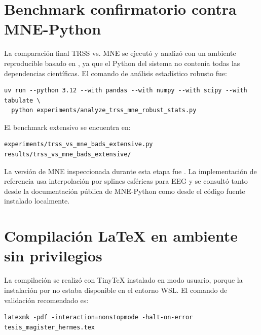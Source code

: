 \section{Benchmark confirmatorio contra MNE-Python}
La comparación final TRSS vs. MNE se ejecutó y analizó con un ambiente reproducible basado en , ya que el Python del sistema no contenía todas las dependencias científicas. El comando de análisis estadístico robusto fue:
\begin{verbatim}
uv run --python 3.12 --with pandas --with numpy --with scipy --with tabulate \
  python experiments/analyze_trss_mne_robust_stats.py
\end{verbatim}

El benchmark extensivo se encuentra en:
\begin{verbatim}
experiments/trss_vs_mne_bads_extensive.py
results/trss_vs_mne_bads_extensive/
\end{verbatim}

La versión de MNE inspeccionada durante esta etapa fue . La implementación de referencia usa interpolación por splines esféricas para EEG y se consultó tanto desde la documentación pública de MNE-Python como desde el código fuente instalado localmente.

\section{Compilación LaTeX en ambiente sin privilegios}
La compilación se realizó con TinyTeX instalado en modo usuario, porque la instalación por  no estaba disponible en el entorno WSL. El comando de validación recomendado es:
\begin{verbatim}
latexmk -pdf -interaction=nonstopmode -halt-on-error tesis_magister_hermes.tex
\end{verbatim}

